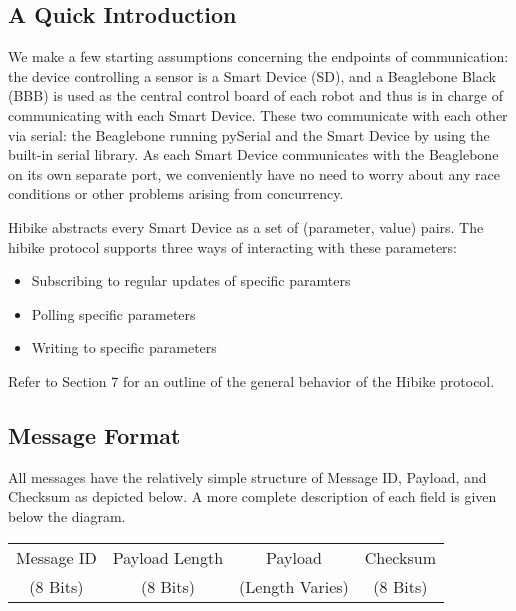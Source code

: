 \documentclass[12pt]{book}
\begin{document}
\subsection{A Quick Introduction}
We make a few starting assumptions concerning the endpoints of communication: the device controlling a sensor is a Smart Device (SD), and a Beaglebone Black (BBB) is used as the central control board of each robot and thus is in charge of communicating with each Smart Device. These two communicate with each other via serial: the Beaglebone running pySerial and the Smart Device by using the built-in serial library. As each Smart Device communicates with the Beaglebone on its own separate port, we conveniently have no need to worry about any race conditions or other problems arising from concurrency.

Hibike abstracts every Smart Device as a set of (parameter, value) pairs.
The hibike protocol supports three ways of interacting with these parameters:
\begin{itemize}
\item Subscribing to regular updates of specific paramters
\item Polling specific parameters
\item Writing to specific parameters
\end{itemize}

Refer to Section 7 for an outline of the general behavior of the Hibike protocol.

\subsection{Message Format}

All messages have the relatively simple structure of Message ID, Payload, and Checksum as
depicted below. A more complete description of each field is given below the diagram.

\begin{center}
	\begin{tabular}{|c|c|c|c|}
	\hline
	Message ID & Payload Length & Payload & Checksum \\
	(8 Bits) & (8 Bits) & (Length Varies) & (8 Bits) \\
	\hline
	\end{tabular}
\end{center}
\end{document}
